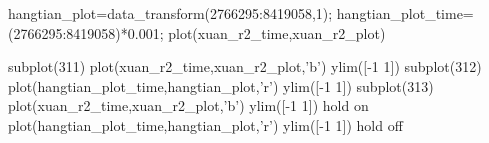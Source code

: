 hangtian_plot=data_transform(2766295:8419058,1);
hangtian_plot_time=(2766295:8419058)*0.001;
plot(xuan_r2_time,xuan_r2_plot)




subplot(311)
plot(xuan_r2_time,xuan_r2_plot,'b')
ylim([-1 1])
subplot(312)
plot(hangtian_plot_time,hangtian_plot,'r')
ylim([-1 1])
subplot(313)
plot(xuan_r2_time,xuan_r2_plot,'b')
ylim([-1 1])
hold on
plot(hangtian_plot_time,hangtian_plot,'r')
ylim([-1 1])
hold off